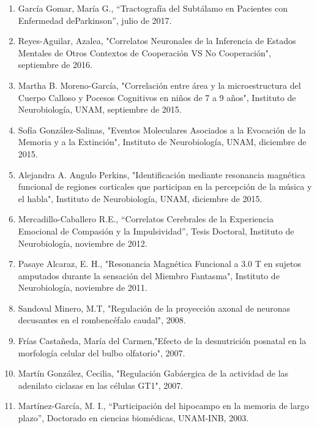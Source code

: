 \begin{enumerate}
\item García Gomar, María G., “Tractografía del Subtálamo en Pacientes con Enfermedad deParkinson”, julio de 2017.

\item Reyes-Aguilar, Azalea, "Correlatos Neuronales de la Inferencia de Estados Mentales de Otros Contextos de Cooperación VS 
No Cooperación", septiembre de 2016.

\item Martha B. Moreno-García, "Correlación entre área y la microestructura del Cuerpo Calloso y Pocesos Cognitivos en niños 
de 
7 a 9 años", Instituto de Neurobiología, UNAM, septiembre de 2015.

\item Sofía González-Salinas, "Eventos Moleculares Asociados a la Evocación de la Memoria y a la Extinción", Instituto de 
Neurobiología, UNAM, diciembre de 2015.

\item Alejandra A. Angulo Perkins, "Identificación mediante resonancia magnética funcional de regiones corticales que 
participan en la percepción de la música y el habla", Instituto de Neurobiología, UNAM,  
diciembre de 2015.

\item Mercadillo-Caballero R.E., “Correlatos Cerebrales de la Experiencia Emocional de Compasión y la Impulsividad”, Tesis 
Doctoral, Instituto de Neurobiología, noviembre de 2012.

\item Pasaye Alcaraz, E. H., "Resonancia Magnética Funcional a 3.0 T en sujetos amputados durante la sensación del Miembro 
Fantasma", Instituto de Neurobiología, noviembre de 2011.

\item Sandoval Minero, M.T, "Regulación de la proyección axonal de neuronas decusantes en el rombencéfalo caudal", 2008.

\item Frías Castañeda, María del Carmen,"Efecto de la desnutrición posnatal en la morfología celular del bulbo olfatorio", 2007.

\item Martín González, Cecilia, "Regulación Gabáergica de la actividad de las adenilato ciclasas en las células GT1", 2007.

\item Martínez-García, M. I., “Participación del hipocampo en la memoria de largo plazo”, Doctorado en ciencias biomédicas, 
UNAM-INB, 2003.
\end{enumerate}

